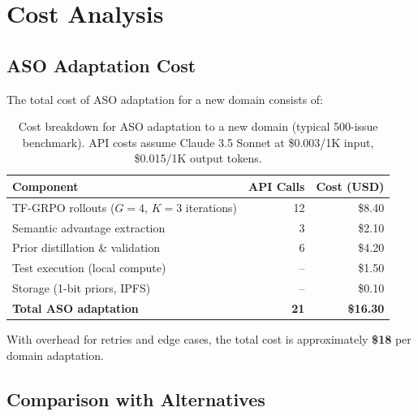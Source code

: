 \section{Cost Analysis}

\label{sec:cost}

\subsection{ASO Adaptation Cost}

The total cost of ASO adaptation for a new domain consists of:

\begin{table}[h]
\centering
\begin{tabular}{lrr}
\toprule
Component & API Calls & Cost (USD) \\
\midrule
TF-GRPO rollouts ($G=4$, $K=3$ iterations) & 12 & \$8.40 \\
Semantic advantage extraction & 3 & \$2.10 \\
Prior distillation \& validation & 6 & \$4.20 \\
Test execution (local compute) & -- & \$1.50 \\
Storage (1-bit priors, IPFS) & -- & \$0.10 \\
\midrule
\textbf{Total ASO adaptation} & \textbf{21} & \textbf{\$16.30} \\
\bottomrule
\end{tabular}
\caption{Cost breakdown for ASO adaptation to a new domain (typical 500-issue
benchmark). API costs assume Claude 3.5 Sonnet at \$0.003/1K input,
\$0.015/1K output tokens.}
\label{tab:aso-cost}
\end{table}

With overhead for retries and edge cases, the total cost is approximately
\textbf{\$18} per domain adaptation.

\subsection{Comparison with Alternatives}

